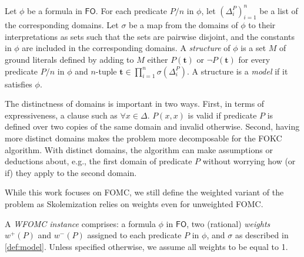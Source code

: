 \documentclass[a4paper,UKenglish,cleveref, autoref, thm-restate]{lipics-v2021}
\newcommand{\FO}{$\mathsf{FO}$}
\begin{document}
\begin{definition}[Model]\label{def:model}
  Let $\phi$ be a formula in \FO{}. For each predicate $P/n$ in $\phi$, let
  ${(\Delta_{i}^{P})}_{i=1}^{n}$ be a list of the corresponding domains. Let
  $\sigma$ be a map from the domains of $\phi$ to their interpretations as sets
  such that the sets are pairwise disjoint, and the constants in $\phi$ are
  included in the corresponding domains. A \emph{structure} of $\phi$ is a set
  $M$ of ground literals defined by adding to $M$ either $P(\mathbf{t})$ or
  $\neg P(\mathbf{t})$ for every predicate $P/n$ in $\phi$ and $n$-tuple
  $\mathbf{t} \in \prod_{i=1}^{n} \sigma(\Delta_{i}^{P})$. A structure is a
  \emph{model} if it satisfies $\phi$.
\end{definition}


\begin{remark}
  The distinctness of domains is important in two ways. First, in terms of
  expressiveness, a clause such as $\forall x \in \Delta\text{. }P(x, x)$ is
  valid if predicate $P$ is defined over two copies of the same domain and
  invalid otherwise. Second, having more distinct domains makes the problem more
  decomposable for the FOKC algorithm. With distinct domains, the algorithm can
  make assumptions or deductions about, e.g., the first domain of predicate $P$
  without worrying how (or if) they apply to the second domain.
\end{remark}

While this work focuses on FOMC, we still define the weighted variant of the
problem as Skolemization relies on weights even for unweighted FOMC.

\begin{definition}\label{def:instance}
  A \emph{WFOMC instance} comprises: a formula $\phi$ in \FO{}, two (rational)
  \emph{weights} $w^{+}(P)$ and $w^{-}(P)$ assigned to each predicate $P$ in
  $\phi$, and $\sigma$ as described in \cref{def:model}. Unless specified
  otherwise, we assume all weights to be equal to 1.
\end{definition}
\end{document}
